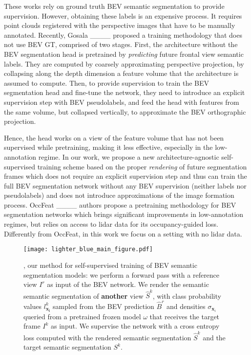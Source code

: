 These works rely on ground truth BEV semantic segmentation to provide supervision. However, obtaining these labels is an expensive process. It requires point clouds registered with the perspective images that have to be manually annotated. Recently, Gosala \etal ____ proposed a training methodology that does not use BEV GT, comprised of two stages. First, the architecture without the BEV segmentation head is pretrained by \emph{predicting} future frontal view semantic labels. They are computed by coarsely approximating perspective projection, \ie by collapsing along the depth dimension a feature volume that the architecture is assumed to compute. Then, to provide supervision to train the BEV segmentation head and fine-tune the network, they need to introduce an explicit supervision step with BEV pseudolabels, and feed the head with features from the same volume, but collapsed vertically, to approximate the BEV orthographic projection. 

Hence, the head works on a view of the feature volume that has not been supervised while pretraining, making it less effective, especially in the low-annotation regime. In our work, we propose a new architecture-agnostic self-supervised training scheme based on the proper \emph{rendering} of future segmentation frames which does not require an explicit supervision step and thus can train the full BEV segmentation network without any BEV supervision (neither labels nor pseudolabels) and does not introduce approximations of the image formation process.
OccFeat ____ authors propose a pretraining methodology for BEV segmentation networks which brings significant improvements in low-annotation regimes, but relies on access to lidar data for its occupancy-guided loss. Differently from OccFeat, in this work we focus on a setting with no lidar data.

\begin{figure*}[t]
     \centering
     \texttt{[image: lighter\_blue\_main\_figure.pdf]}
     \caption{\ourmethod, our method for self-supervised training of BEV semantic segmentation models: we perform a forward pass with a reference view $I^r$ as input of the BEV network. We render the semantic semantic segmentation of \textbf{another} view $\hat{S}^k$, with class probability values $l^k_{\mathbf{x_i}}$ sampled from the BEV prediction $\hat{B}^r$ and densities $\sigma_{\mathbf{x}_i}$ queried from a pretrained frozen model $\omega$ that receives the target frame $I^k$ as input. We supervise the network with a cross entropy loss computed with the rendered semantic segmentation $\hat{S}^k$ and the target semantic segmentation $S^k$.}
     \label{fig:main_figure_method}
\end{figure*}

